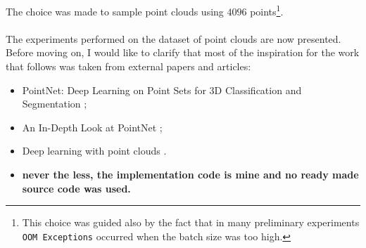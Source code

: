 \documentclass[11pt,a4paper]{article}
\begin{document}
\noindent
The choice was made to sample point clouds using $4096$ points\footnote{This choice was guided also by the fact that in many preliminary experiments \texttt{OOM Exceptions} occurred when the batch size was too high.}.\\
\\
The experiments performed on the dataset of point clouds are now presented. Before moving on, I would like to clarify that most of the inspiration for the work that follows was taken from external papers and articles:
\begin{itemize}
    \item PointNet: Deep Learning on Point Sets for 3D Classification and Segmentation \cite{qi2017pointnet};
    \item An In-Depth Look at PointNet \cite{mediumcompointnet};
    \item Deep learning with point clouds \cite{romainthalineaupointclouds}.
    \item \textbf{never the less, the implementation code is mine and no ready made source code was used.}
\end{itemize}
\end{document}
